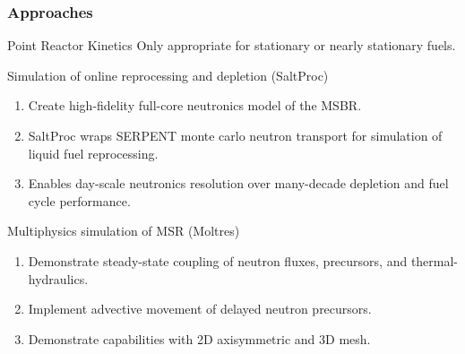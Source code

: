 \begin{frame}
  \frametitle{Approaches}
                  \vspace*{-0.1in}
              \begin{block}{Point Reactor Kinetics \cite{huff_pyrk_2015}}
                Only appropriate for stationary or nearly stationary fuels.
              \end{block}

              \begin{block}{Simulation of online reprocessing and depletion (SaltProc)\cite{rykhlevskii_saltproc}}
               \begin{enumerate}
                \item Create high-fidelity full-core neutronics model of the 
                        \gls{MSBR}.
                \item SaltProc wraps SERPENT monte carlo neutron transport for 
                        simulation of liquid fuel reprocessing.
                \item Enables day-scale neutronics resolution over many-decade depletion and fuel cycle performance.
               \end{enumerate}
               \end{block}

              \begin{block}{Multiphysics simulation of \gls{MSR} (Moltres)\cite{lindsay_introduction_2018}}
               \begin{enumerate}
                \item Demonstrate steady-state coupling of neutron fluxes, precursors, and thermal-hydraulics.
                \item Implement advective movement of delayed neutron precursors.
                \item Demonstrate capabilities with 2D axisymmetric and 3D mesh.
               \end{enumerate}
               \end{block}


              
\end{frame}
